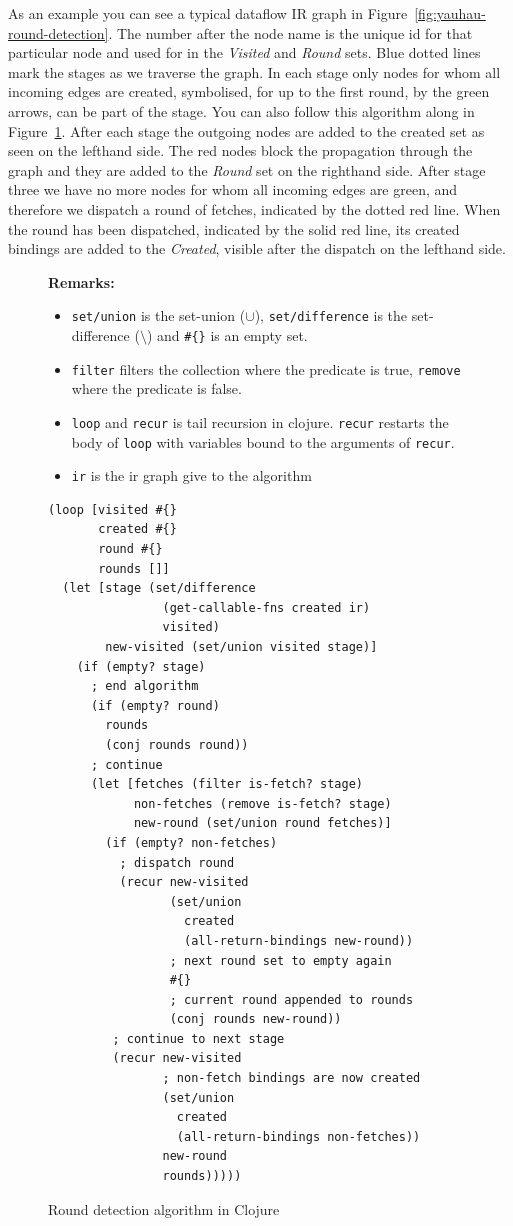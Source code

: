 As an example you can see a typical dataflow IR graph in Figure~\ref{fig:yauhau-round-detection}.
The number after the node name is the unique id for that particular node and used for in the \emph{Visited} and \emph{Round} sets.
Blue dotted lines mark the stages as we traverse the graph.
In each stage only nodes for whom all incoming edges are created, symbolised, for up to the first round, by the green arrows, can be part of the stage.
You can also follow this algorithm along in Figure~\ref{fig:round-detection}.
After each stage the outgoing nodes are added to the created set as seen on the lefthand side.
The red \fetch{} nodes block the propagation through the graph and they are added to the \emph{Round} set on the righthand side.
After stage three we have no more nodes for whom all incoming edges are green, and therefore we dispatch a round of fetches, indicated by the dotted red line.
When the round has been dispatched, indicated by the solid red line, its created bindings are added to the \emph{Created}, visible after the dispatch on the lefthand side.

\begin{figure}
\textbf{Remarks:}
\begin{itemize}
  \item \texttt{set/union} is the set-union ($\cup$), \texttt{set/difference} is the set-difference ($\setminus$) and \texttt{\#\{\}} is an empty set.
  \item \texttt{filter} filters the collection where the predicate is true, \texttt{remove} where the predicate is false.
  \item \texttt{loop} and \texttt{recur} is tail recursion in clojure.
    \texttt{recur} restarts the body of \texttt{loop} with variables bound to the arguments of \texttt{recur}.
  \item \texttt{ir} is the ir graph give to the algorithm
\end{itemize}
\begin{verbatim}
(loop [visited #{}
       created #{}
       round #{}
       rounds []]
  (let [stage (set/difference
                (get-callable-fns created ir)
                visited)
        new-visited (set/union visited stage)]
    (if (empty? stage)
      ; end algorithm
      (if (empty? round)
        rounds
        (conj rounds round))
      ; continue
      (let [fetches (filter is-fetch? stage)
            non-fetches (remove is-fetch? stage)
            new-round (set/union round fetches)]
        (if (empty? non-fetches)
          ; dispatch round
          (recur new-visited
                 (set/union
                   created
                   (all-return-bindings new-round))
                 ; next round set to empty again
                 #{}
                 ; current round appended to rounds
                 (conj rounds new-round))
         ; continue to next stage
         (recur new-visited
                ; non-fetch bindings are now created
                (set/union
                  created
                  (all-return-bindings non-fetches))
                new-round
                rounds)))))
\end{verbatim}
\caption{Round detection algorithm in Clojure}
\label{fig:round-detection}
\end{figure}

